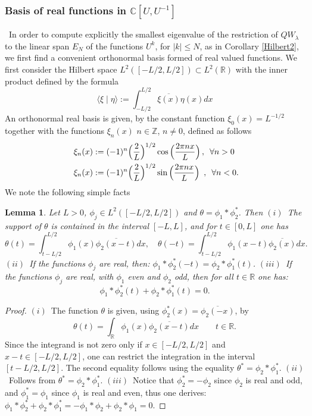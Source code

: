 \documentclass[cupthm]{CUP-JNL-JMJ}
\def\C{{\mathbb C}}
\def\R{{\mathbb R}}
\def\Z{{\mathbb Z}}
\def\qqq{\,,\,~\forall}
\numberwithin{equation}{section}
\theoremstyle{cupplain}
\newtheorem{lemma}[theorem]{Lemma}
\theoremstyle{cupdefinition}
\theoremstyle{cupremark}
\theoremstyle{cupproof}
\newtheorem{proof}{Proof}
\begin{document}
\subsubsection{Basis  of real functions in $\C[U,U^{-1}]$}\label{sectrealbasis}
~In order to compute explicitly the smallest eigenvalue of the restriction of $QW_\lambda$  to the linear span $E_N$ of the functions $U^k$, for $\vert k\vert \leq N$, as in Corollary \ref{Hilbert2}, we first find a convenient orthonormal basis formed of real valued functions. We first consider the Hilbert space $L^2([-L/2,L/2])\subset L^2(\R)$ with the inner product defined by the formula
$$
\langle \xi\mid \eta \rangle:= \int_{-L/2}^{L/2} \overline{\xi(x)}\eta(x)dx 
$$
 An orthonormal real basis is given, by the constant function $\xi_0(x)=L^{-1/2}$ together with  the functions $\xi_n(x)$ $n\in \Z$, $n\neq 0$, defined as follows %
\begin{align}\label{basis}
 \ \xi_n(x)&:=(-1)^n\Big(\frac 2L\Big)^{1/2}\cos\Big(\frac{2 \pi n x}{L}\Big)\qqq n>0\\
 \xi_n(x)&:=(-1)^n\Big(\frac 2L\Big)^{1/2}\sin\Big(\frac{2 \pi n x}{L}\Big) \ \qqq  n<0.\notag
\end{align}
We note the following simple facts
\begin{lemma}\label{polarize}
Let $L>0$, $\phi_j \in L^2([-L/2,L/2])$ and $\theta=\phi_1 * \phi_2^*$. Then\newline
$(i)$~The support of $\theta$ is contained in the interval $[-L,L]$, and for $t\in [0,L]$ one has 
$$
\theta(t)=\int_{t-L/2}^{L/2} \phi_1(x)\overline{\phi_2(x-t)}dx, \quad 
\theta(-t)=\int_{t-L/2}^{L/2} \phi_1(x-t)\overline{\phi_2(x)}dx.
$$
$(ii)$~If the functions $\phi_j$ are real, then: $\phi_1 * \phi_2^*(-t)=\phi_2 * \phi_1^*(t)$.\newline
$(iii)$~If the functions $\phi_j$ are real, with $\phi_1$  even and $\phi_2$  odd, then for all $t\in \R$ one has: $$\phi_1 * \phi_2^*(t)+\phi_2 * \phi_1^*(t)=0.$$
\end{lemma}
\begin{proof} $(i)$~The  function $\theta$ is given, using $\phi_2^ *(x)=\overline{\phi_2(-x)}$, by
$$
\theta(t)=\int_\R \phi_1(x)\overline{\phi_2(x-t)}dx\qquad t\in\R.
$$
Since the integrand is not zero only if $x\in [-L/2,L/2]$ and $x-t\in [-L/2,L/2]$, one can restrict the integration  in the interval $[t-L/2, L/2]$. The second equality follows using the equality $\theta^*=\phi_2 * \phi_1^*$. \newline
$(ii)$~Follows from $\theta^*=\phi_2 * \phi_1^*$.\newline
$(iii)$~Notice that $\phi_2^*=-\phi_2$ since $\phi_2$ is real and odd, and $\phi_1^*=\phi_1$ since $\phi_1$ is real and even, thus one derives: $\phi_1*\phi_2^*+\phi_2*\phi_1^*=-\phi_1*\phi_2+\phi_2*\phi_1=0$.
\end{proof} 
\end{document}
